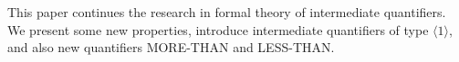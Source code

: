 
This paper continues the research in formal theory of intermediate quantifiers. We present some new properties, introduce intermediate quantifiers of type $\langle 1\rangle$, and also new quantifiers MORE-THAN and LESS-THAN.
%

